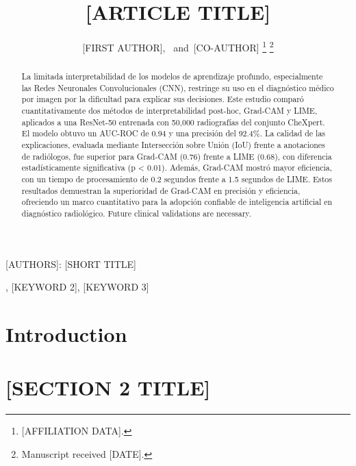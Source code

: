 \documentclass[journal]{IEEEtran}
\begin{document}
\title{[ARTICLE TITLE]}

\author{[FIRST AUTHOR],~
        and~[CO-AUTHOR]%
\thanks{[AFFILIATION DATA].}%
\thanks{Manuscript received [DATE].}}

%
{[AUTHORS]: [SHORT TITLE]}

\maketitle

\begin{abstract}
La limitada interpretabilidad de los modelos de aprendizaje profundo, especialmente las Redes Neuronales Convolucionales (CNN), restringe su uso en el diagnóstico médico por imagen por la dificultad para explicar sus decisiones. Este estudio comparó cuantitativamente dos métodos de interpretabilidad post-hoc, Grad-CAM y LIME, aplicados a una ResNet-50 entrenada con 50,000 radiografías del conjunto CheXpert. El modelo obtuvo un AUC-ROC de 0.94 y una precisión del 92.4\%. La calidad de las explicaciones, evaluada mediante Intersección sobre Unión (IoU) frente a anotaciones de radiólogos, fue superior para Grad-CAM (0.76) frente a LIME (0.68), con diferencia estadísticamente significativa (p < 0.01). Además, Grad-CAM mostró mayor eficiencia, con un tiempo de procesamiento de 0.2 segundos frente a 1.5 segundos de LIME. Estos resultados demuestran la superioridad de Grad-CAM en precisión y eficiencia, ofreciendo un marco cuantitativo para la adopción confiable de inteligencia artificial en diagnóstico radiológico. Future clinical validations are necessary.
\end{abstract}

\begin{IEEEkeywords}
[KEYWORD 1], [KEYWORD 2], [KEYWORD 3]
\end{IEEEkeywords}

\IEEEpeerreviewmaketitle


\section{Introduction}
\label{sec:intro}



\section{[SECTION 2 TITLE]}
\label{sec:section2}
\end{document}
